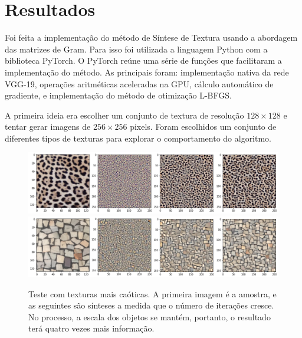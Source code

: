 \chapter{Resultados}


Foi feita a implementação do
método de Síntese de Textura
usando a abordagem das matrizes
de Gram. 
Para isso foi utilizada 
a linguagem Python com a
biblioteca PyTorch.
O PyTorch reúne uma série de
funções que facilitaram
a implementação do método.
As principais foram: implementação
nativa da rede VGG-19, operações
aritméticas aceleradas na GPU,
cálculo automático de gradiente,
e implementação do método de
otimização L-BFGS.


A primeira ideia era escolher um
conjunto de textura de resolução
$128 \times 128$ e tentar gerar
imagens de $256 \times 256$ pixels.
Foram escolhidos um conjunto de
diferentes tipos de texturas 
para explorar o comportamento
do algoritmo.



\begin{figure}[!ht]
	\centering
	\includegraphics[width=\linewidth]{files/assets/results/result2.png}
	\includegraphics[width=\linewidth]{files/assets/results/result5.png}
	\caption{Teste com texturas mais caóticas. A primeira imagem
	é a amostra, e as seguintes são sínteses a medida que
	o número de iterações cresce.
	No processo, a escala dos objetos se mantém, portanto, o resultado
	terá quatro vezes mais informação.}
	\label{img:preview}
\end{figure}


